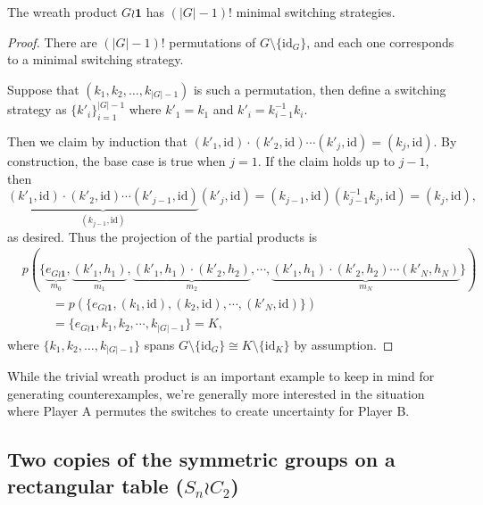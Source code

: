 \begin{proposition}
  The wreath product $G \wr \mathbf{1}$ has $(|G|-1)!$ minimal switching
  strategies.
\end{proposition}
\begin{proof}
  There are $(|G| - 1)!$ permutations of $G \setminus \{\mathrm{id}_G\}$, and each
  one corresponds to a minimal switching strategy.

  Suppose that $(k_1, k_2, \dots, k_{|G|-1})$ is such a permutation, then
  define a switching strategy as $\{k'_i\}_{i=1}^{|G|-1}$ where $k'_1 = k_1$ and
  $k'_i = k_{i-1}^{-1}k_i$.

  Then we claim by induction that
  $(k'_1, \mathrm{id})\cdot(k'_2, \mathrm{id})\cdots(k'_j, \mathrm{id}) = (k_j, \mathrm{id})$.
  By construction, the base case is true when $j = 1$. If the claim holds up to
  $j-1$, then \[
    \underbrace{
      (k'_1, \mathrm{id})\cdot(k'_2, \mathrm{id})\cdots(k'_{j-1}, \mathrm{id})
    }_{(k_{j-1}, \mathrm{id})}
    (k'_j, \mathrm{id})
    = (k_{j-1}, \mathrm{id})(k_{j-1}^{-1}k_j, \mathrm{id})
    = (k_j, \mathrm{id}),
  \] as desired.
  Thus the projection of the partial products is
  \begin{align}
    &p(\{
      \underbrace{e_{G \wr \mathbf{1}}}_{m_0},
      \underbrace{(k'_1, h_1)}_{m_1},
      \underbrace{(k'_1, h_1)\cdot(k'_2, h_2)}_{m_2},
      \cdots,
      \underbrace{(k'_1, h_1)\cdot(k'_2, h_2)\cdots(k'_N, h_N)}_{m_N}
    \}) \\
    & \hspace{1cm} =
    p(\{
      e_{G \wr \mathbf{1}},
      (k_1, \mathrm{id}),
      (k_2, \mathrm{id}),
      \cdots,
      (k'_N, \mathrm{id})
    \}) \\
    & \hspace{1cm} = \{e_{G \wr \mathbf{1}}, k_1, k_2, \cdots,k_{|G|-1}\} = K,
  \end{align}
  where $\{k_1, k_2, \dots, k_{|G|-1}\}$ spans
  $G \setminus \{\mathrm{id}_G\} \cong K \setminus \{\mathrm{id}_K\}$ by
  assumption.
\end{proof}

While the trivial wreath product is an important example to keep in mind for
generating counterexamples, we're generally more interested in the situation
where Player A permutes the switches to create uncertainty for Player B.

\subsection{Two copies of the symmetric groups on a rectangular table (\texorpdfstring{$S_n \wr C_2$}{Sn wr C2})}

